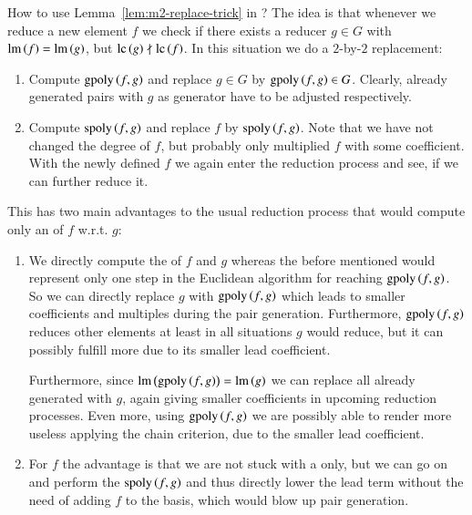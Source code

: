 How to use Lemma~\ref{lem:m2-replace-trick} in \sbba ? The idea is that whenever
we reduce a new element $f$ we check if there exists a reducer $g\in G$ with
$\operatorname{lm}\left({f}\right) = \operatorname{lm}\left({g}\right)$, but $\mathrm{lc}\left({g}\right) \nmid \mathrm{lc}\left({f}\right)$. In this situation we do a $2$-by-$2$
replacement:
\begin{enumerate}
\item Compute $\mathrm{gpoly}\left({f},{g}\right)$ and replace $g\in G$ by $\mathrm{gpoly}\left({f},{g}\right) \in G$. Clearly,
already generated pairs with $g$ as generator have to be adjusted respectively.
\item Compute $\mathrm{spoly}\left({f},{g}\right)$ and replace $f$ by $\mathrm{spoly}\left({f},{g}\right)$. Note that we have not
changed the degree of $f$, but probably only multiplied $f$ with some
coefficient. With the newly defined $f$ we again enter the reduction process and
see, if we can further reduce it.
\end{enumerate}
This has two main advantages to the usual reduction process that would compute
only an \lcr of $f$ w.r.t. $g$:
\begin{enumerate}
\item We directly compute the \gpt of $f$ and $g$
whereas the before mentioned \lcr would represent only one step in the Euclidean
algorithm for reaching $\mathrm{gpoly}\left({f},{g}\right)$. So we can directly replace $g$ with
$\mathrm{gpoly}\left({f},{g}\right)$ which leads to smaller coefficients and multiples during the pair
generation. Furthermore, $\mathrm{gpoly}\left({f},{g}\right)$ reduces other elements at least in all
situations $g$ would reduce, but it can possibly fulfill more \ltrs due to its
smaller lead coefficient.

Furthermore, since $\operatorname{lm}\left({\mathrm{gpoly}\left({f},{g}\right)}\right) = \operatorname{lm}\left({g}\right)$ we can replace all \spts already generated
with $g$, again giving smaller coefficients in upcoming reduction processes.
Even more, using $\mathrm{gpoly}\left({f},{g}\right)$ we are possibly able to render more \spts useless
applying the chain criterion, due to the smaller lead coefficient.
\item For $f$ the advantage is that we are not stuck with a \lcr only, but we
can go on and perform the \ltr $\mathrm{spoly}\left({f},{g}\right)$ and thus directly lower the lead term
without the need of adding $f$ to the basis, which would blow up pair
generation.
\end{enumerate}

